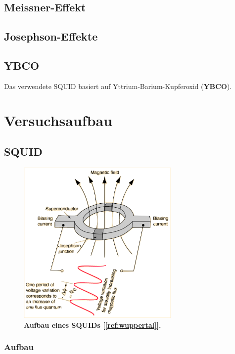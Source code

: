 \documentclass[a4paper,ngerman]{scrartcl}
\begin{document}
\subsection{Meissner-Effekt}

\subsection{Josephson-Effekte}


\subsection{YBCO}

Das verwendete SQUID basiert auf Yttrium-Barium-Kupferoxid (\textbf{YBCO}). 


\section{Versuchsaufbau}

\subsection{SQUID}



\begin{figure}
\centering
\includegraphics[width=0.7\textwidth]{abbildungen/squide.png}
\caption[Versuchsplatz]{\textbf{Aufbau eines SQUIDs [\ref{ref:wuppertal}].}}
\label{fig:squid_wuppertal}
\end{figure}

\subsubsection{Aufbau}
\end{document}
